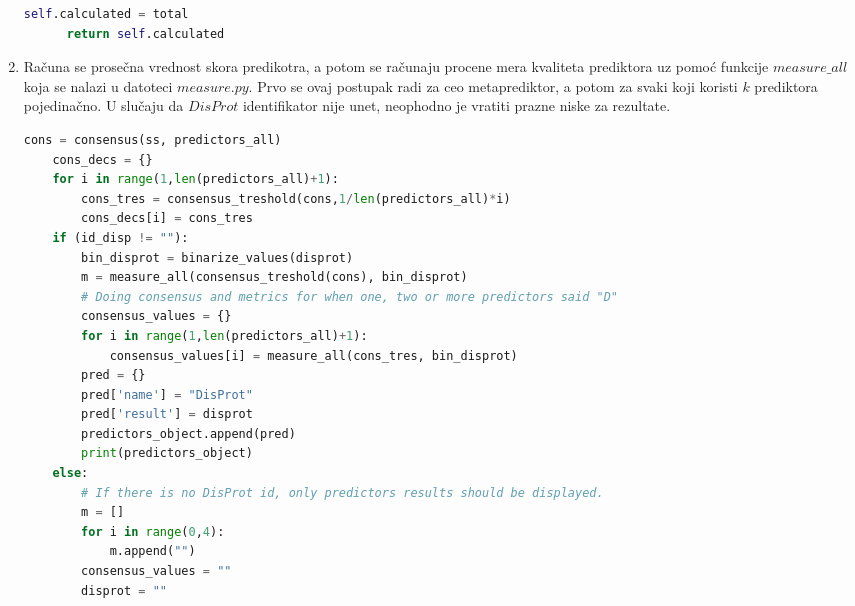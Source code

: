 \begin{enumerate}
\begin{lstlisting}[language=Python]
      self.calculated = total
      return self.calculated
\end{lstlisting}
\item Računa se prosečna vrednost skora predikotra, a potom se računaju procene mera kvaliteta prediktora uz pomoć funkcije $measure\_all$ koja se nalazi u datoteci $measure.py$.  Prvo se ovaj postupak radi za ceo metaprediktor, a potom za svaki koji koristi $k$ prediktora pojedinačno. U slučaju da $DisProt$ identifikator nije unet, neophodno je vratiti prazne niske za rezultate.
\begin{lstlisting}[language=Python]
    cons = consensus(ss, predictors_all)
    cons_decs = {}
    for i in range(1,len(predictors_all)+1):
        cons_tres = consensus_treshold(cons,1/len(predictors_all)*i)
        cons_decs[i] = cons_tres
    if (id_disp != ""):
        bin_disprot = binarize_values(disprot)
        m = measure_all(consensus_treshold(cons), bin_disprot)
        # Doing consensus and metrics for when one, two or more predictors said "D"
        consensus_values = {}
        for i in range(1,len(predictors_all)+1):
            consensus_values[i] = measure_all(cons_tres, bin_disprot) 
        pred = {}
        pred['name'] = "DisProt"
        pred['result'] = disprot
        predictors_object.append(pred) 
        print(predictors_object)
    else:
        # If there is no DisProt id, only predictors results should be displayed.
        m = []
        for i in range(0,4):
            m.append("")
        consensus_values = ""
        disprot = ""   


\end{lstlisting}
\end{enumerate}

